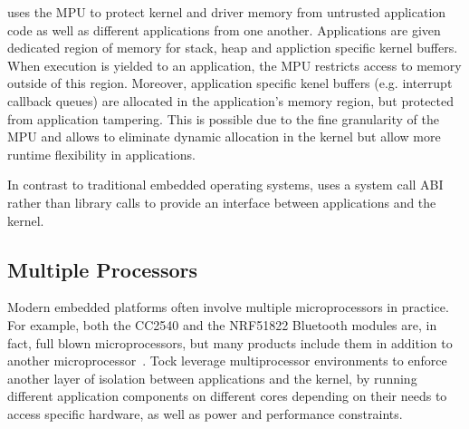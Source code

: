 \name uses the MPU to protect kernel and driver memory from untrusted
application code as well as different applications from one another.
Applications are given dedicated region of memory for stack, heap and appliction
specific kernel buffers. When execution is yielded to an application, the MPU
restricts access to memory outside of this region. Moreover, application
specific kenel buffers (e.g. interrupt callback queues) are allocated in the
application's memory region, but protected from application tampering. This is
possible due to the fine granularity of the MPU and allows \name to eliminate
dynamic allocation in the kernel but allow more runtime flexibility in
applications.

In contrast to traditional embedded operating systems, \name uses a system call
ABI rather than library calls to provide an interface between applications and
the kernel.

\subsection{Multiple Processors}

Modern embedded platforms often involve multiple microprocessors in practice.
For example, both the CC2540 and the NRF51822 Bluetooth modules are, in fact,
full blown microprocessors, but many products include them in addition to
another microprocessor~. Tock leverage
multiprocessor environments to enforce another layer of isolation between
applications and the kernel, by running different application components on
different cores depending on their needs to access specific hardware, as well as
power and performance constraints.

